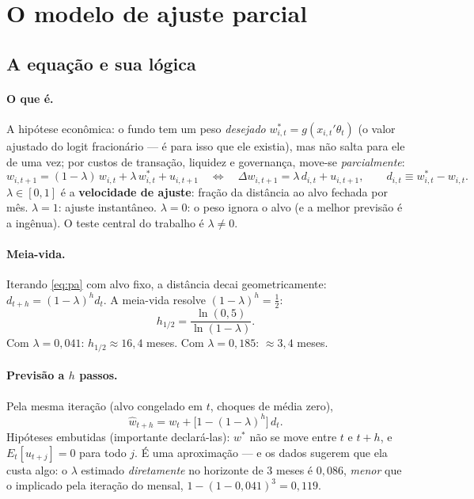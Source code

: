 \documentclass[11pt,a4paper]{article}
\newcommand{\oquee}[0]{\paragraph{O que é.}}
\begin{document}
\section{O modelo de ajuste parcial}
\label{sec:pa}

\subsection{A equação e sua lógica}

\oquee A hipótese econômica: o fundo tem um peso \emph{desejado} $w^*_{i,t}=g(x_{i,t}'\theta_t)$
(o valor ajustado do logit fracionário --- é para isso que ele existia), mas não salta para ele de
uma vez; por custos de transação, liquidez e governança, move-se \emph{parcialmente}:
\begin{equation}
w_{i,t+1} = (1-\lambda)\,w_{i,t} + \lambda\,w^*_{i,t} + u_{i,t+1}
\quad\Longleftrightarrow\quad
\Delta w_{i,t+1} = \lambda\,d_{i,t} + u_{i,t+1},
\qquad d_{i,t}\equiv w^*_{i,t}-w_{i,t}.
\label{eq:pa}
\end{equation}
$\lambda\in[0,1]$ é a \textbf{velocidade de ajuste}: fração da distância ao alvo fechada por mês.
$\lambda=1$: ajuste instantâneo. $\lambda=0$: o peso ignora o alvo (e a melhor previsão é a
ingênua). O teste central do trabalho é $\lambda\neq0$.

\paragraph{Meia-vida.} Iterando \eqref{eq:pa} com alvo fixo, a distância decai geometricamente:
$d_{t+h}=(1-\lambda)^h d_t$. A meia-vida resolve $(1-\lambda)^h=\tfrac12$:
\begin{equation}
h_{1/2} = \frac{\ln(0{,}5)}{\ln(1-\lambda)}.
\end{equation}
Com $\lambda=0{,}041$: $h_{1/2}\approx16{,}4$ meses. Com $\lambda=0{,}185$: $\approx3{,}4$ meses.

\paragraph{Previsão a $h$ passos.} Pela mesma iteração (alvo congelado em $t$, choques de média
zero),
\begin{equation}
\widehat w_{t+h} = w_t + \big[1-(1-\lambda)^h\big]\,d_t .
\label{eq:hstep}
\end{equation}
Hipóteses embutidas (importante declará-las): $w^*$ não se move entre $t$ e $t+h$, e
$E_t[u_{t+j}]=0$ para todo $j$. É uma aproximação --- e os dados sugerem que ela custa algo: o
$\lambda$ estimado \emph{diretamente} no horizonte de 3 meses é $0{,}086$, \emph{menor} que o
implicado pela iteração do mensal, $1-(1-0{,}041)^3=0{,}119$.
\end{document}
